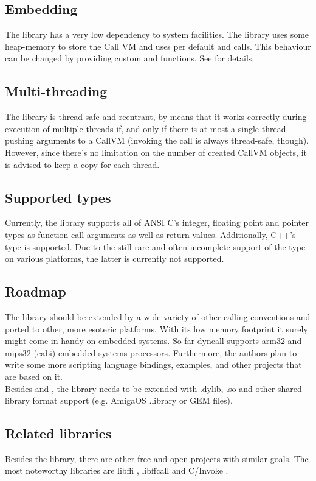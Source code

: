 \subsection{Embedding}

The  library has a very low dependency to system facilities.
The library uses some heap-memory to store the Call VM and uses per default
 and  calls. This behaviour can be changed by 
providing custom  and  functions.
See  for details.


\subsection{Multi-threading}

The  library is thread-safe and reentrant, by means that it
works correctly during execution of multiple threads if, and only if there is
at most a single thread pushing arguments to a CallVM (invoking the call is
always thread-safe, though). However, since there's no limitation on the
number of created CallVM objects, it is advised to keep a copy for each
thread.


\subsection{Supported types}

Currently, the  library supports all of ANSI C's integer,
floating point and pointer types as function call arguments as well as return
values. Additionally, C++'s  type is supported. Due to the still
rare and often incomplete support of the  type on various
platforms, the latter is currently not supported.


\subsection{Roadmap}

The  library should be extended by a wide variety of other
calling conventions and ported to other, more esoteric platforms. With its low
memory footprint it surely might come in handy on embedded systems. So far
dyncall supports arm32 and mips32 (eabi) embedded systems processors.
Furthermore, the authors plan to write some more scripting language bindings,
examples, and other projects that are based on it.\\
Besides  and , the 
library needs to be extended with .dylib, .so and other shared library format
support (e.g. AmigaOS .library or GEM \cite{.ldg} files).


\subsection{Related libraries}

Besides the  library, there are other free and open projects
with similar goals. The most noteworthy libraries are libffi \cite{libffi},
libffcall \cite{libffcall} and C/Invoke \cite{cinvoke}.
